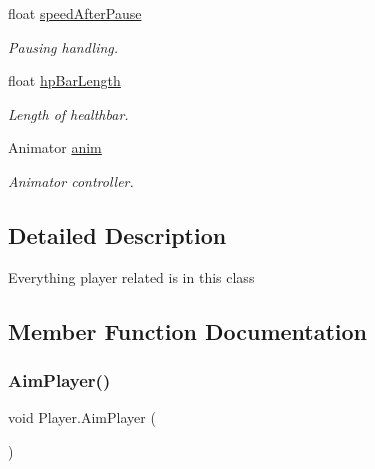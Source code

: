 \begin{DoxyCompactItemize}
\mbox{\label{class_player_acc2c43dd193b137522c1ad100fff0822}} 
float \hyperlink{class_player_acc2c43dd193b137522c1ad100fff0822}{speed\+After\+Pause}
\begin{DoxyCompactList}\small\item\em Pausing handling. \end{DoxyCompactList}\item 
\mbox{\label{class_player_a49e75b5b68fa87751080bf40504fbdf3}} 
float \hyperlink{class_player_a49e75b5b68fa87751080bf40504fbdf3}{hp\+Bar\+Length}
\begin{DoxyCompactList}\small\item\em Length of healthbar. \end{DoxyCompactList}\item 
\mbox{\label{class_player_a70b6b51d74cd56fa84d032a4024792e6}} 
Animator \hyperlink{class_player_a70b6b51d74cd56fa84d032a4024792e6}{anim}
\begin{DoxyCompactList}\small\item\em Animator controller. \end{DoxyCompactList}\end{DoxyCompactItemize}


\subsection{Detailed Description}
Everything player related is in this class 

\subsection{Member Function Documentation}
\mbox{\label{class_player_a65c37e862c41df23b43ffc646ffa9fd0}} 
\subsubsection{\texorpdfstring{Aim\+Player()}{AimPlayer()}}
{\footnotesize\ttfamily void Player.\+Aim\+Player (\begin{DoxyParamCaption}{ }\end{DoxyParamCaption})\hspace{0.3cm}{\ttfamily [private]}}

